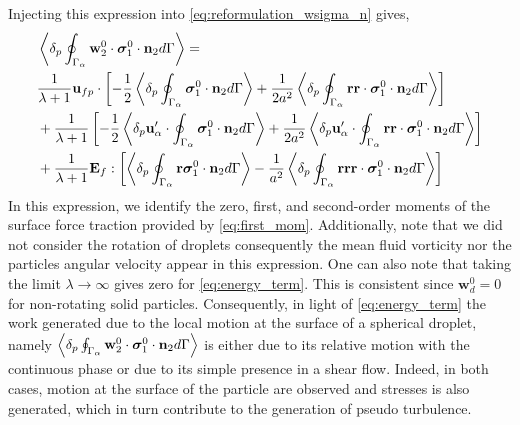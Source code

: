 Injecting this expression into \ref{eq:reformulation_wsigma_n} gives, 
\begin{align}
    &\pSavg{\textbf{w}_2^0 \cdot \bm{\sigma}_1^0\cdot\textbf{n}_2}
    =  \nonumber \\
    &\frac{1}{\lambda+1}\textbf{u}_{fp} \cdot \left[
        -\frac{1}{2}\pSavg{ \bm{\sigma}_1^0\cdot\textbf{n}_2}
        + \frac{1}{2a^2}
        \pSavg{\textbf{rr}\cdot \bm{\sigma}_1^0\cdot\textbf{n}_2}
    \right]\nonumber
    \\
    &+ \frac{1}{\lambda+1} \left[
        -\frac{1}{2}
        \pavg{\textbf{u}_\alpha' \cdot  \intS{\bm{\sigma}_1^0\cdot\textbf{n}_2}}
        + \frac{1}{2a^2}
        \pavg{\textbf{u}_\alpha' \cdot \intS{\textbf{rr}\cdot \bm{\sigma}_1^0\cdot\textbf{n}_2}}
    \right] \nonumber
    \\
    &+ \frac{1}{\lambda + 1} \textbf{E}_{f} : \left[ 
         \pSavg{\textbf{r} \bm{\sigma}_1^0\cdot\textbf{n}_2}
         -\frac{1}{a^2} 
         \pSavg{ \textbf{rrr} \cdot \bm{\sigma}_1^0\cdot\textbf{n}_2}
         \right]
    \label{eq:energy_term}
\end{align}
In this expression, we identify the zero, first, and second-order moments of the surface force traction provided by \ref{eq:first_mom}. 
Additionally, note that we did not consider the rotation of droplets consequently the mean fluid vorticity nor the particles angular velocity appear in this expression. 
One can also note that taking the limit $\lambda \to \infty$ gives zero for \ref{eq:energy_term}. 
This is consistent since $\textbf{w}_d^0 = 0$ for non-rotating solid particles. 
Consequently, in light of \ref{eq:energy_term} the work generated due to the local motion at the surface of a spherical droplet, namely  $\left<\delta_p \oint_{\Gamma_{\alpha}} \textbf{w}_2^0 \cdot \bm{\sigma}_1^0\cdot\textbf{n}_2 d\Gamma\right>$ is either due to its relative motion with the continuous phase or due to its simple presence in a shear flow. 
Indeed, in both cases, motion at the surface of the particle are observed and stresses is also generated, which in turn contribute to the generation of pseudo turbulence. 
